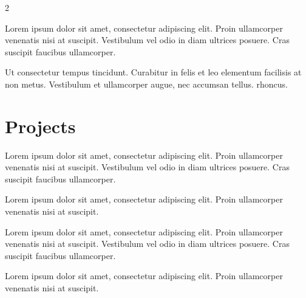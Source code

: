 \documentclass[]{plushcv}
\begin{document}
\begin{paracol}{2}
\begin{tightemize}
\item Lorem ipsum dolor sit amet, consectetur adipiscing elit. Proin ullamcorper venenatis nisi at suscipit. Vestibulum vel odio in diam ultrices posuere. Cras suscipit faucibus ullamcorper.
\item Ut consectetur tempus tincidunt. Curabitur in felis et leo elementum facilisis at non metus. Vestibulum et ullamcorper augue, nec accumsan tellus.
 rhoncus.
\end{tightemize}
\sectionsep



\section{Projects}

\begin{tightemize}
\item Lorem ipsum dolor sit amet, consectetur adipiscing elit. Proin ullamcorper venenatis nisi at suscipit. Vestibulum vel odio in diam ultrices posuere. Cras suscipit faucibus ullamcorper.
\item Lorem ipsum dolor sit amet, consectetur adipiscing elit. Proin ullamcorper venenatis nisi at suscipit.
\end{tightemize}
\sectionsep

\begin{tightemize}
\item Lorem ipsum dolor sit amet, consectetur adipiscing elit. Proin ullamcorper venenatis nisi at suscipit. Vestibulum vel odio in diam ultrices posuere. Cras suscipit faucibus ullamcorper. 
\item Lorem ipsum dolor sit amet, consectetur adipiscing elit. Proin ullamcorper venenatis nisi at suscipit.
\end{tightemize}
\sectionsep


%
%


\end{paracol}
\end{document}
